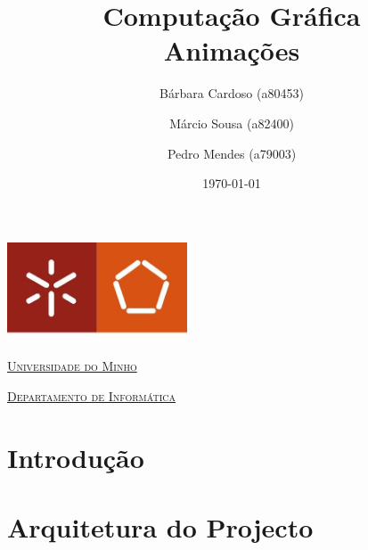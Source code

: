 \documentclass[a4paper]{article}
\begin{document}
\title{Computação Gráfica\\ Animações}
\author{Bárbara Cardoso (a80453) \and Márcio Sousa (a82400) \and Pedro Mendes (a79003)}
\date{\today}

\begin{titlepage}

    \thispagestyle{empty}
    \begin{center}
        \begin{minipage}{0.75\linewidth}
            \centering
            \includegraphics[width=0.4\textwidth]{eng.jpeg}\par\vspace{1cm}
            \vspace{1.5cm}
            \href{https://www.uminho.pt/PT}{\scshape\LARGE Universidade do Minho} \par
            \vspace{1cm}
            \href{https://www.di.uminho.pt/}{\scshape\Large Departamento de Informática} \par
            \vspace{1.5cm}

            \maketitle
        \end{minipage}
    \end{center}

\end{titlepage}

\tableofcontents

\pagebreak

\section{Introdução}


\section{Arquitetura do Projecto}
\end{document}
